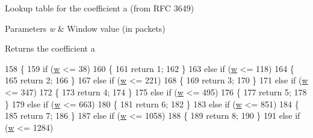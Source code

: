 Lookup table for the coefficient a (from R\+FC 3649) 


\begin{DoxyParams}{Parameters}
{\em w} & Window value (in packets)\\
\hline
\end{DoxyParams}
\begin{DoxyReturn}{Returns}
the coefficient a 
\end{DoxyReturn}

\begin{DoxyCode}
158 \{
159   \textcolor{keywordflow}{if} (\hyperlink{lte_2model_2fading-traces_2fading__trace__generator_8m_afd61ec66f9d7b807eece6eb12c781844}{w} <= 38)
160     \{
161       \textcolor{keywordflow}{return} 1;
162     \}
163   \textcolor{keywordflow}{else} \textcolor{keywordflow}{if} (\hyperlink{lte_2model_2fading-traces_2fading__trace__generator_8m_afd61ec66f9d7b807eece6eb12c781844}{w} <= 118)
164     \{
165       \textcolor{keywordflow}{return} 2;
166     \}
167   \textcolor{keywordflow}{else} \textcolor{keywordflow}{if} (\hyperlink{lte_2model_2fading-traces_2fading__trace__generator_8m_afd61ec66f9d7b807eece6eb12c781844}{w} <= 221)
168     \{
169       \textcolor{keywordflow}{return} 3;
170     \}
171   \textcolor{keywordflow}{else} \textcolor{keywordflow}{if} (\hyperlink{lte_2model_2fading-traces_2fading__trace__generator_8m_afd61ec66f9d7b807eece6eb12c781844}{w} <= 347)
172     \{
173       \textcolor{keywordflow}{return} 4;
174     \}
175   \textcolor{keywordflow}{else} \textcolor{keywordflow}{if} (\hyperlink{lte_2model_2fading-traces_2fading__trace__generator_8m_afd61ec66f9d7b807eece6eb12c781844}{w} <= 495)
176     \{
177       \textcolor{keywordflow}{return} 5;
178     \}
179   \textcolor{keywordflow}{else} \textcolor{keywordflow}{if} (\hyperlink{lte_2model_2fading-traces_2fading__trace__generator_8m_afd61ec66f9d7b807eece6eb12c781844}{w} <= 663)
180     \{
181       \textcolor{keywordflow}{return} 6;
182     \}
183   \textcolor{keywordflow}{else} \textcolor{keywordflow}{if} (\hyperlink{lte_2model_2fading-traces_2fading__trace__generator_8m_afd61ec66f9d7b807eece6eb12c781844}{w} <= 851)
184     \{
185       \textcolor{keywordflow}{return} 7;
186     \}
187   \textcolor{keywordflow}{else} \textcolor{keywordflow}{if} (\hyperlink{lte_2model_2fading-traces_2fading__trace__generator_8m_afd61ec66f9d7b807eece6eb12c781844}{w} <= 1058)
188     \{
189       \textcolor{keywordflow}{return} 8;
190     \}
191   \textcolor{keywordflow}{else} \textcolor{keywordflow}{if} (\hyperlink{lte_2model_2fading-traces_2fading__trace__generator_8m_afd61ec66f9d7b807eece6eb12c781844}{w} <= 1284)

\end{DoxyCode}
